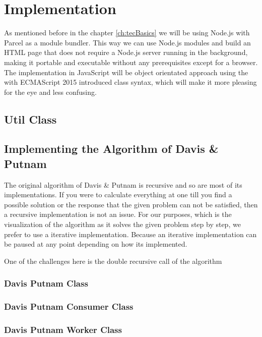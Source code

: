 
\chapter{Implementation}
\label{ch:implementation}
As mentioned before in the chapter \ref{ch:tecBasics} we will be using Node.js with Parcel as a module bundler. This way we can use Node.js modules and build an HTML page that does not require a Node.js server running in the background, making it portable and executable without any prerequisites except for a browser. The implementation in JavaScript will be object orientated approach using the with ECMAScript 2015 introduced class syntax, which will make it more pleasing for the eye and less confusing.

\section{Util Class}
\label{sec:impUtil}

\section{Implementing the Algorithm of Davis \& Putnam}
\label{sec:impDavisPutnam}
The original algorithm of Davis \& Putnam is recursive and so are most of its implementations. If you were to calculate everything at one till you find a possible solution or the response that the given problem can not be satisfied, then a recursive implementation is not an issue. For our purposes, which is the visualization of the algorithm as it solves the given problem step by step, we prefer to use a iterative implementation. Because an iterative implementation can be paused at any point depending on how its implemented.

One of the challenges here is the double recursive call of the algorithm

\subsection{Davis Putnam Class}

\subsection{Davis Putnam Consumer Class}

\subsection{Davis Putnam Worker Class}

